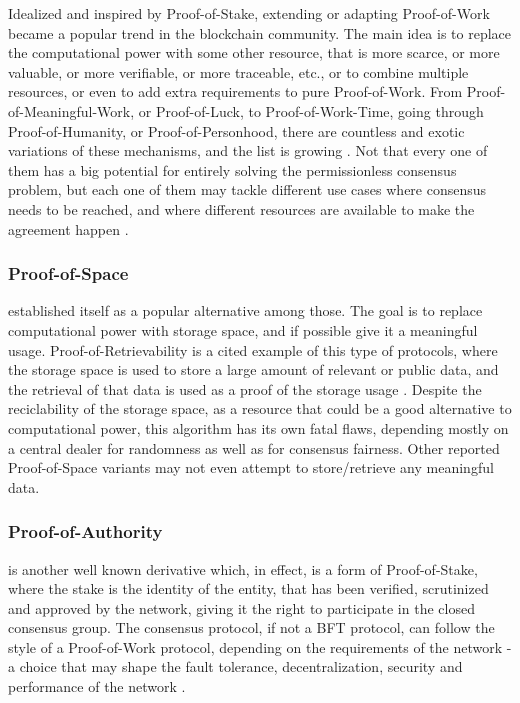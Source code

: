 \documentclass[journal]{IEEEtran}
\begin{document}
Idealized and inspired by Proof-of-Stake, extending or adapting Proof-of-Work
became a popular trend in the blockchain community. The main idea is to
replace the computational power with some other resource, that is
more scarce, or more valuable, or more verifiable, or more traceable, etc.,
or to combine multiple resources, or even to add extra requirements to 
pure Proof-of-Work. From Proof-of-Meaningful-Work, or Proof-of-Luck, 
to Proof-of-Work-Time, going through Proof-of-Humanity, or Proof-of-Personhood, there
are countless and exotic variations of these mechanisms, and the list is growing \cite{token-economy-gitbook, 9376868}.
Not that every one of them has a big potential for entirely solving the permissionless consensus problem,
but each one of them may tackle different use cases where consensus needs to be reached, 
and where different resources are available to make the agreement happen \cite{BOURAGA2021114384, 9376868}.

\subsubsection{Proof-of-Space} established itself as a popular alternative among those.
The goal is to replace computational power with storage space,
and if possible give it a meaningful usage. Proof-of-Retrievability is
a cited example of this type of protocols, where the storage space is
used to store a large amount of relevant or public data, and the retrieval of that data
is used as a proof of the storage usage \cite{juels2007pors}. Despite the reciclability 
of the storage space, as a resource that could be a good alternative
to computational power, this algorithm has its own fatal flaws, depending
mostly on a central dealer for randomness as well as for consensus fairness.
Other reported Proof-of-Space variants may not even attempt to store/retrieve any meaningful data.

\subsubsection{Proof-of-Authority} is another well known derivative
which, in effect, is a form of Proof-of-Stake, where the stake is the 
identity of the entity, that has been verified, scrutinized and
approved by the network, giving it the right to participate in the
closed consensus group. The consensus protocol, if not a BFT protocol, 
can follow the style of a Proof-of-Work protocol, depending on the 
requirements of the network - a choice that may shape the fault tolerance,
decentralization, security and performance of the network \cite{survey-dist-consensus}.
\end{document}
